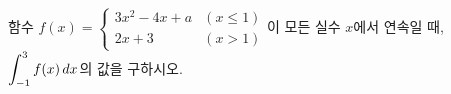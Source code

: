 함수 $f(x)=\begin{cases} 3x^2-4x+a & (x\le 1) \\ 2x+3 & (x>1) \end{cases}$이 모든 실수 $x$에서 연속일 때, $\displaystyle\int_{-1}^{3}f(x)\mkern3mu dx$의 값을 구하시오. 
